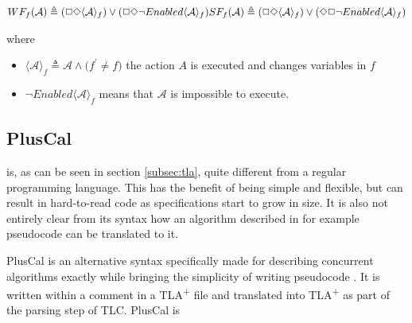 \documentclass[english, biblatex, digitaloutput]{kththesis}
\begin{document}
\begin{math}
	WF_f\lparen \mathcal{A} \rparen \triangleq \lparen \Box \Diamond \langle \mathcal{A} \rangle_f \rparen \lor  \lparen \Box \Diamond \neg Enabled \langle \mathcal{A} \rangle_f \rparen \\
	SF_f\lparen \mathcal{A} \rparen \triangleq \lparen \Box \Diamond \langle \mathcal{A} \rangle_f \rparen \lor  \lparen \Diamond \Box \neg Enabled \langle \mathcal{A} \rangle_f \rparen
\end{math}

where

\begin{itemize}
	\item $\langle \mathcal{A} \rangle_f \triangleq \mathcal{A} \land \lparen f^\prime \neq f \rparen $ \ie the action $A$ is executed and changes variables in $f$
	\item $\neg Enabled \langle \mathcal{A} \rangle_f$ means that $\mathcal{A}$ is impossible to execute.
\end{itemize}


\subsection{PlusCal}

 is, as can be seen in section \ref{subsec:tla}, quite different from a regular programming language. This has the benefit of being simple and flexible, but can result in hard-to-read code as specifications start to grow in size. It is also not entirely clear from its syntax how an algorithm described in for example pseudocode can be translated to it.

PlusCal is an alternative syntax specifically made for describing concurrent algorithms exactly while bringing the simplicity of writing pseudocode \cite{leucker_pluscal_2009}. It is written within a comment in a TLA\textsuperscript+ file and translated into TLA\textsuperscript+ as part of the parsing step of TLC. PlusCal is



\end{document}
